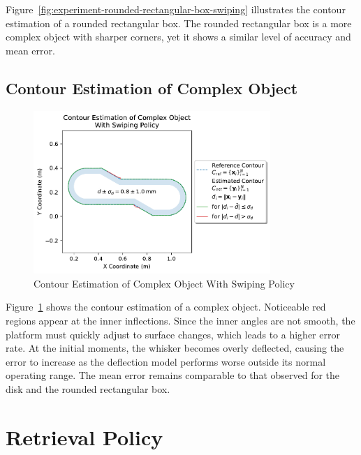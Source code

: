 Figure~\ref{fig:experiment-rounded-rectangular-box-swiping} illustrates the contour estimation of a rounded rectangular box.
The rounded rectangular box is a more complex object with sharper corners, yet it shows a similar level of accuracy and mean error.

\subsection{Contour Estimation of Complex Object}

\begin{figure}[htb]
    \centering
    \includegraphics[width=0.8\textwidth]{figures/experiments/complex-object-swiping}
    \caption{Contour Estimation of Complex Object With Swiping Policy}
    \label{fig:experiment-complex-object-swiping}
\end{figure}


Figure~\ref{fig:experiment-complex-object-swiping} shows the contour estimation of a complex object.
Noticeable red regions appear at the inner inflections.
Since the inner angles are not smooth, the platform must quickly adjust to surface changes, which leads to a higher error rate.
At the initial moments, the whisker becomes overly deflected, causing the error to increase as the deflection model performs worse outside its normal operating range.
The mean error remains comparable to that observed for the disk and the rounded rectangular box.


\section{Retrieval Policy}

